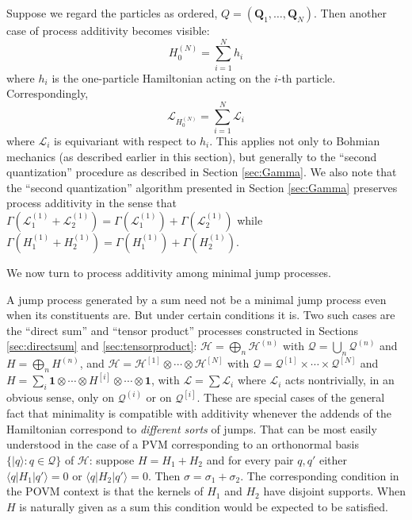\documentclass[12pt]{article}
\newcommand{\1}{\mathbf{1}} %
\newcommand{\Hilbert}{\mathscr{H}}
\renewcommand{\sp}[2]{\langle #1 | #2 \rangle} %
\newcommand{\conf}{\mathcal{Q}} %
\newcommand{\generator}{\mathscr{L}} %
\newcommand{\vQ}{{\boldsymbol Q}}
\begin{document}
Suppose we regard the particles as ordered, $Q = (\vQ_1, \ldots,
\vQ_N)$. Then another case of process additivity becomes visible:
\[
   H_0^{(N)} = \sum_{i=1}^N h_i
\]
where $h_i$ is the one-particle Hamiltonian acting on the $i$-th
particle. Correspondingly,
\[
   \generator_{H_0^{(N)}} = \sum_{i=1}^N \generator_i
\]
where $\generator_i$ is equivariant with respect to $h_i$. This
applies not only to Bohmian mechanics (as described earlier in this
section), but generally to the ``second quantization'' procedure as
described in Section \ref{sec:Gamma}.  We also note that the ``second
quantization'' algorithm presented in Section \ref{sec:Gamma}
preserves process additivity in the sense that
$\Gamma(\generator_1^{(1)} + \generator_2^{(1)}) =
\Gamma(\generator_1^{(1)}) + \Gamma(\generator_2^{(1)})$ while
$\Gamma(H_1^{(1)} + H_2^{(1)}) = \Gamma(H_1^{(1)}) +
\Gamma(H_2^{(1)})$.

\label{sec:miniadd}

We now turn to process additivity among minimal jump processes.

A jump process generated by a sum need not be a minimal jump process
even when its constituents are.  But under certain conditions it is.
Two such cases are the ``direct sum'' and ``tensor product'' processes
constructed in Sections \ref{sec:directsum} and
\ref{sec:tensorproduct}: $\Hilbert = \bigoplus_n \Hilbert^{(n)}$ with
$\conf = \bigcup_n \conf^{(n)}$ and $H =\bigoplus_n H^{(n)}$, and
$\Hilbert = \Hilbert^{[1]} \otimes \cdots \otimes \Hilbert^{[N]}$ with
$\conf = \conf^{[1]} \times \cdots \times \conf^{[N]}$ and $H = \sum_i
\1 \otimes \cdots \otimes H^{[i]} \otimes \cdots \otimes \1$, with
$\generator = \sum \generator_i$ where $\generator_i$ acts
nontrivially, in an obvious sense, only on $\conf^{(i)}$ or on
$\conf^{[i]}$.  These are special cases of the general fact that
minimality is compatible with additivity whenever the addends of the
Hamiltonian correspond to \emph{different sorts} of jumps. That can be
most easily understood in the case of a PVM corresponding to an
orthonormal basis $\{|q\rangle : q \in \conf\}$ of $\Hilbert$: suppose
$H=H_1 + H_2$ and for every pair $q,q'$ either $\sp{q}{H_1|q'} =0$ or
$\sp{q}{H_2 |q'} =0$. Then $\sigma = \sigma_1 + \sigma_2$.  The
corresponding condition in the POVM context is that the kernels of
$H_1$ and $H_2$ have disjoint supports. When $H$ is naturally given as
a sum this condition would be expected to be satisfied.
\end{document}
